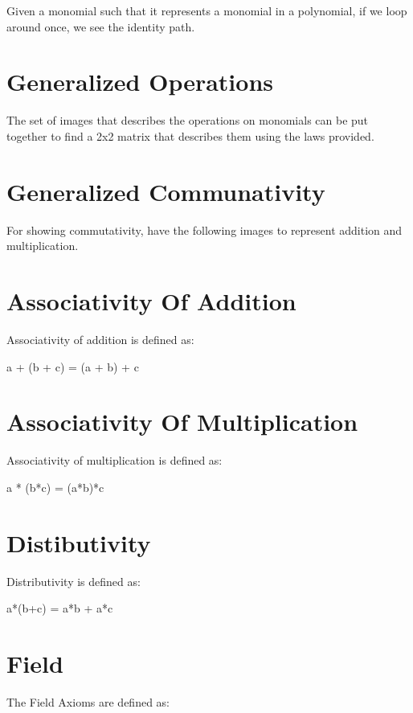 Given a monomial such that it represents a monomial in a polynomial, if we loop around once, we see the identity path.

\section{Generalized Operations}

The set of images that describes the operations on monomials can be put together to find a 2x2 matrix that describes them using the laws provided.

\section{Generalized Communativity}

For showing commutativity, have the following images to represent addition and multiplication.

\section{Associativity Of Addition}

Associativity of addition is defined as:

a + (b + c) = (a + b) + c

\section{Associativity Of Multiplication}

Associativity of multiplication is defined as:

a * (b*c) = (a*b)*c

\section{Distibutivity}

Distributivity is defined as:

a*(b+c) = a*b + a*c

\section{Field}

The Field Axioms are defined as:

